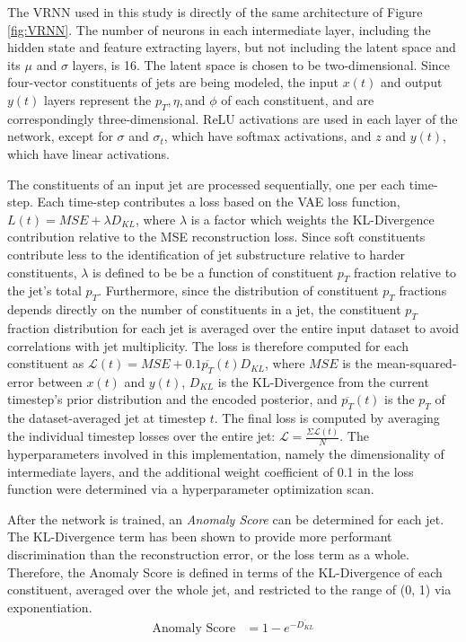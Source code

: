 \documentclass[12pt, a4paper]{article}
\begin{document}
The VRNN used in this study is directly of the same architecture of Figure \ref{fig:VRNN}. The number of neurons in each intermediate layer, including the hidden state and feature extracting layers, but not including the latent space and its $\mu$ and $\sigma$ layers, is 16. The latent space is chosen to be two-dimensional. Since four-vector constituents of jets are being modeled, the input $x(t)$ and output $y(t)$ layers represent the $p_{T}, \eta, $and $\phi$ of each constituent, and are correspondingly three-dimensional. ReLU activations are used in each layer of the network, except for $\sigma$ and $\sigma_{t}$, which have softmax activations, and $z$ and $y(t)$, which have linear activations. 

The constituents of an input jet are processed sequentially, one per each time-step. 
Each time-step contributes a loss based on the VAE loss function, $L(t) = MSE + \lambda D_{KL}$, where $\lambda$ is a factor which weights the KL-Divergence contribution relative to the MSE reconstruction loss.
Since soft constituents contribute less to the identification of jet substructure relative to harder constituents, $\lambda$ is defined to be be a function of constituent $p_{T}$ fraction relative to the jet's total $p_{T}$. 
Furthermore, since the distribution of constituent $p_{T}$ fractions depends directly on the number of constituents in a jet, the constituent $p_{T}$ fraction distribution for each jet is averaged over the entire input dataset to avoid correlations with jet multiplicity. The loss is therefore computed for each constituent as $\mathcal{L}(t)=MSE+0.1\overline{p_T}(t)D_{KL}$, where $MSE$ is the mean-squared-error between $x(t)$ and $y(t)$, $D_{KL}$ is the KL-Divergence from the current timestep's prior distribution and the encoded posterior, and $\overline{p_T}(t)$ is the $p_T$ of the dataset-averaged jet at timestep $t$. The final loss is computed by averaging the individual timestep losses over the entire jet: $\mathcal{L} = \frac{\Sigma \mathcal{L}(t)}{N}$. The hyperparameters involved in this implementation, namely the dimensionality of intermediate layers, and the additional weight coefficient of 0.1 in the loss function were determined via a hyperparameter optimization scan. 

After the network is trained, an \textit{Anomaly Score} can be determined for each jet. The KL-Divergence term has been shown to provide more performant discrimination than the reconstruction error, or the loss term as a whole. Therefore, the Anomaly Score is defined in terms of the KL-Divergence of each constituent, averaged over the whole jet, and restricted to the range of (0, 1) via exponentiation. 
\begin{align*}
\text{Anomaly Score} &= 1 - e^{-\overline{D_{KL}}}
\end{align*}
\end{document}
